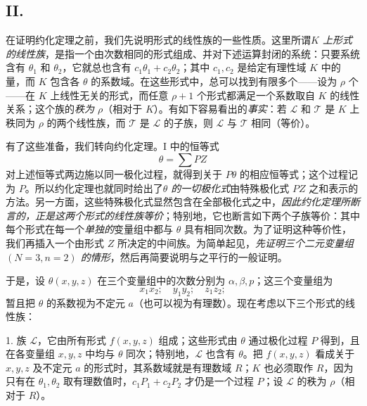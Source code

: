\subsection*{II.}
在证明约化定理之前，我们先说明形式的线性族的一些性质。这里所谓\emph{$K$ 上形式的线性族}，是指一个由次数相同的形式组成、并对下述运算封闭的系统：只要系统含有 $\theta_1$ 和 $\theta_2$，它就总也含有 $c_1\theta_1+c_2\theta_2$；其中 $c_1,c_2$ 是给定有理性域 $K$ 中的量，而 $K$ 包含各 $\theta$ 的系数域。在这些形式中，总可以找到有限多个——设为 $\rho$ 个——在 $K$ 上线性无关的形式，而任意 $\rho+1$ 个形式都满足一个系数取自 $K$ 的线性关系；这个族的\emph{秩为 $\rho$}（相对于 $K$）。有如下容易看出的\emph{事实}：若 $\mathcal L$ 和 $\mathcal T$ 是 $K$ 上秩同为 $\rho$ 的两个线性族，而 $\mathcal T$ 是 $\mathcal L$ 的子族，则 $\mathcal L$ 与 $\mathcal T$ 相同（等价）。

有了这些准备，我们转向约化定理。I 中的恒等式
\[
  \theta=\sum PZ
\]
对上述恒等式两边施以同一极化过程，就得到关于 $P\theta$ 的相应恒等式；这个过程记为 $P$。所以约化定理也就同时给出了\emph{$\theta$ 的一切极化式}由特殊极化式 $PZ$ 之和表示的方法。另一方面，这些特殊极化式显然包含在全部极化式之中，\emph{因此约化定理所断言的，正是这两个形式的线性族等价}；特别地，它也断言如下两个子族等价：其中每个形式在每一个\emph{单独的}变量组中都与 $\theta$ 具有相同次数。为了证明这种等价性，我们再插入一个由形式 $Z$ 所决定的中间族。为简单起见，\emph{先证明三个二元变量组 $(N=3,n=2)$ 的情形}，然后再简要说明与之平行的一般证明。

于是，设 $\theta(x,y,z)$ 在三个变量组中的次数分别为 $\alpha,\beta,p$；这三个变量组为
\[
  x_1x_2;\quad y_1y_2;\quad z_1z_2;
\]
暂且把 $\theta$ 的系数视为不定元 $a$（也可以视为有理数）。现在考虑以下三个形式的线性族：

1. 族 $\mathcal L$，它由所有形式 $f(x,y,z)$ 组成；这些形式由 $\theta$ 通过极化过程 $P$ 得到，且在各变量组 $x,y,z$ 中均与 $\theta$ 同次；特别地，$\mathcal L$ 也含有 $\theta$。把 $f(x,y,z)$ 看成关于 $x,y,z$ 及不定元 $a$ 的形式时，其系数域就是有理数域 $R$；$K$ 也必须取作 $R$，因为只有在 $\theta_1,\theta_2$ 取有理数值时，$c_1P_1+c_2P_2$ 才仍是一个过程 $P$；设 $\mathcal L$ 的秩为 $\rho$（相对于 $R$）。

